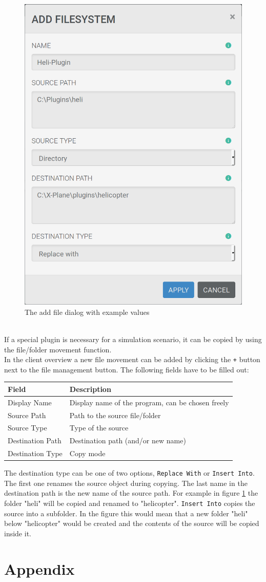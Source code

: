 \documentclass[accentcolor=tud1a, paper=a4, colorback]{tudreport}
\begin{document}
	\begin{figure}[h]
		\centering
		\label{add_filesystem}
		\includegraphics[width=.4\textwidth]{add_filesystem}
		\caption{The add file dialog with example values}
	\end{figure}
	\\
	If a special plugin is necessary for a simulation scenario, it can be copied by using
	the file/folder movement function.
	\\
	In the client overview a new file movement can be added by clicking the \texttt{+} button
	next to the file management button. The following fields have to be filled out:
	\\
	\begin{center}
	\begin{tabular}{l|l}
		Field & Description \\\hline
		Display Name &  Display name of the program, can be chosen freely\\
		Source Path & Path to the source file/folder\\
		Source Type & Type of the source\\
		Destination Path & Destination path (and/or new name)\\
		Destination Type & Copy mode\\
	\end{tabular}
	\end{center}
	The destination type can be one of two options, \texttt{Replace With} or \texttt{Insert Into}.
	The first one renames the source object during copying. The last name in the destination path
	is the new name of the source path. For example in figure \ref{add_filesystem} the folder 
	"heli" will be copied and renamed to "helicopter".
	\texttt{Insert Into} copies the source into a subfolder. In the figure this would mean that
	a new folder "heli" below "helicopter" would be created and the contents of the source will
	be copied inside it.

	\chapter{Appendix}

	\clearpage
	\printindex
\end{document}
